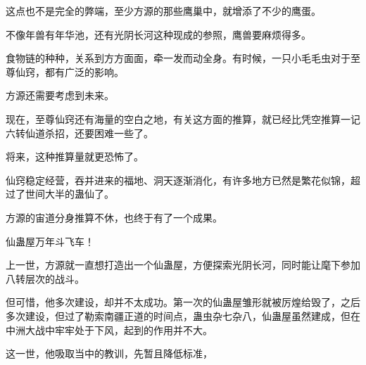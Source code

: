 \begin{this_body}
这点也不是完全的弊端，至少方源的那些鹰巢中，就增添了不少的鹰蛋。

不像年兽有年华池，还有光阴长河这种现成的参照，鹰兽要麻烦得多。

食物链的种种，关系到方方面面，牵一发而动全身。有时候，一只小毛毛虫对于至尊仙窍，都有广泛的影响。

方源还需要考虑到未来。

现在，至尊仙窍还有海量的空白之地，有关这方面的推算，就已经比凭空推算一记六转仙道杀招，还要困难一些了。

将来，这种推算量就更恐怖了。

仙窍稳定经营，吞并进来的福地、洞天逐渐消化，有许多地方已然是繁花似锦，超过了世间大半的蛊仙了。

方源的宙道分身推算不休，也终于有了一个成果。

仙蛊屋万年斗飞车！

上一世，方源就一直想打造出一个仙蛊屋，方便探索光阴长河，同时能让麾下参加八转层次的战斗。

但可惜，他多次建设，却并不太成功。第一次的仙蛊屋雏形就被厉煌给毁了，之后多次建设，但过了勒索南疆正道的时间点，蛊虫杂七杂八，仙蛊屋虽然建成，但在中洲大战中牢牢处于下风，起到的作用并不大。

这一世，他吸取当中的教训，先暂且降低标准，

\end{this_body}

